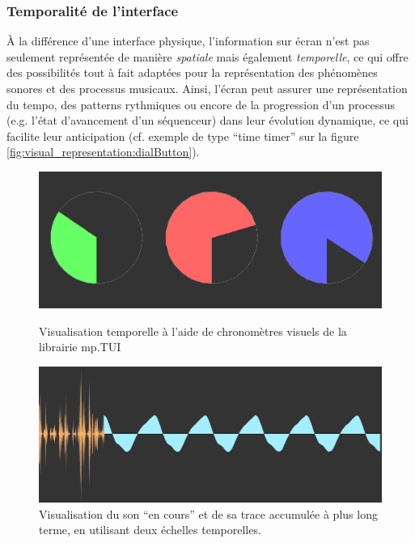 \subsubsection{Temporalité de l'interface} 

\noindent À la différence d'une interface physique, l'information sur écran n'est pas seulement représentée de manière \textit{spatiale} mais également \textit{temporelle}, ce qui offre des possibilités tout à fait adaptées pour la représentation des phénomènes sonores et des processus musicaux. Ainsi, l'écran peut assurer une représentation du tempo, des patterns rythmiques ou encore de la progression d'un processus (e.g. l'état d'avancement d'un séquenceur) dans leur évolution dynamique, ce qui facilite leur anticipation (cf. exemple de type ``time timer'' sur la figure \ref{fig:visual_representation:dialButton}).\\
\begin{figure}[!htbp]
	\captionsetup{format=plain}%
	\centering
	\begin{minipage}[t]{0.48\textwidth}
		\includegraphics[width=\linewidth]{gfx/06_visual_representation/mpTUI-DialButton.png}
		\caption[Visualisation temporelle à l'aide de chronomètres visuels]{Visualisation temporelle à l'aide de chronomètres visuels de la librairie mp.TUI}
		\label{fig:visual_representation:dialButton}
	\end{minipage}
	\hspace{.02\linewidth}
	\begin{minipage}[t]{0.48\textwidth}
	    \includegraphics[width=\linewidth]{gfx/06_visual_representation/LAM-DSW.png}
		\caption[Deux échelles temporelles différentes d'un flux audio]{Visualisation du son ``en cours'' et de sa trace accumulée à plus long terme, en utilisant deux échelles temporelles.}
		\label{fig:visual_representation:DSW}
	\end{minipage}
\end{figure}
